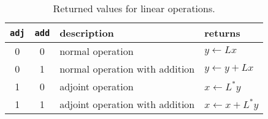 \begin{table}[htbp]
   \centering
   \caption{Returned values for linear operations.}
   \begin{tabular}{ccll} %
      \hline\hline
      \texttt{adj} & \texttt{add} & description & returns\\
      \hline\hline
       0  & 0 & normal operation                & $ y\leftarrow Lx$      \\\hline
       0  & 1 & normal operation with addition  & $ y\leftarrow y+Lx$    \\\hline
       1  & 0 & adjoint operation               & $ x\leftarrow L^*y$    \\\hline
       1  & 1 & adjoint operation with addition & $ x\leftarrow x +L^*y$ \\
      \hline\hline
   \end{tabular}
   \label{tab:adjadd}
\end{table}

















